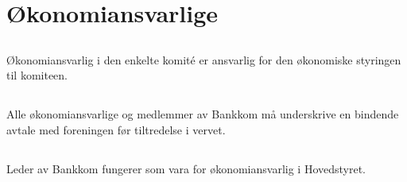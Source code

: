 \section{Økonomiansvarlige}

\subsection{}
Økonomiansvarlig i den enkelte komité er ansvarlig for den økonomiske styringen til komiteen.

\subsection{}
Alle økonomiansvarlige og medlemmer av Bankkom må underskrive en bindende avtale med foreningen før tiltredelse i vervet.

\subsection{}
Leder av Bankkom fungerer som vara for økonomiansvarlig i Hovedstyret.

